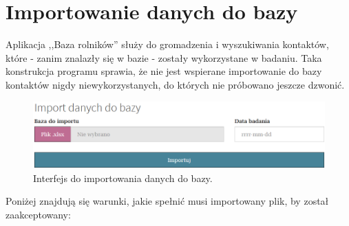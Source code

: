 \documentclass[12pt, twoside, hidelinks]{report}
\begin{document}
\section{Importowanie danych do bazy}
Aplikacja ,,Baza rolników'' służy do gromadzenia i wyszukiwania kontaktów, które - zanim znalazły się w bazie - zostały wykorzystane w badaniu. Taka konstrukcja programu sprawia, że nie jest wspierane importowanie do bazy kontaktów nigdy niewykorzystanych, do których nie próbowano jeszcze dzwonić. \par
\begin{figure}[h!]
\includegraphics[width = 1\textwidth]{2.1.}
\caption{Interfejs do importowania danych do bazy.}
\label{importowanie_danych_do_bazy_interfejs}
\end{figure}
Poniżej znajdują się warunki, jakie spełnić musi importowany plik, by został zaakceptowany:
\end{document}
